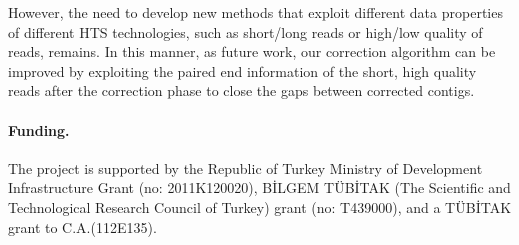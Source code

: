 \documentclass{llncs}
\begin{document}
However, the need to develop new methods that exploit different data properties of different HTS technologies, such as short/long reads or high/low quality of reads, remains. In this manner, as future work, our correction algorithm can be improved by exploiting the paired end information of the short, high quality reads after the correction phase to close the gaps between corrected contigs.

\paragraph{Funding.}

The project is supported by the Republic of Turkey Ministry of Development Infrastructure Grant (no: 2011K120020), BİLGEM TÜBİTAK (The Scientific and Technological Research Council of Turkey) grant (no: T439000), and a TÜBİTAK grant to C.A.(112E135).\\
\end{document}
